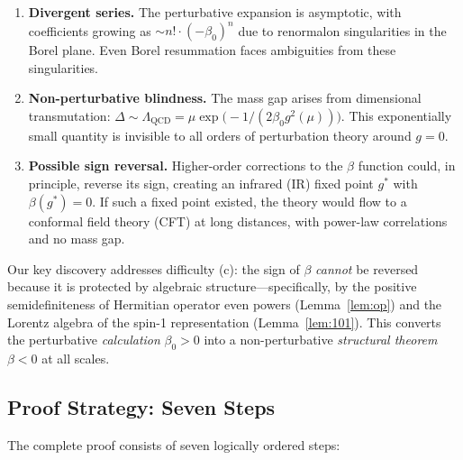 \documentclass[12pt,a4paper]{article}
\theoremstyle{plain}
\theoremstyle{definition}
\theoremstyle{remark}
\begin{document}
\begin{enumerate}[label=(\alph*),leftmargin=2.5em]
\item \textbf{Divergent series.} The perturbative expansion is asymptotic, with coefficients growing as $\sim n!\cdot(-\beta_0)^n$ due to renormalon singularities in the Borel plane. Even Borel resummation faces ambiguities from these singularities.

\item \textbf{Non-perturbative blindness.} The mass gap arises from dimensional transmutation: $\Delta\sim\Lambda_{\mathrm{QCD}}=\mu\exp\!\bigl(-1/(2\beta_0 g^2(\mu))\bigr)$. This exponentially small quantity is invisible to all orders of perturbation theory around $g=0$.

\item \textbf{Possible sign reversal.} Higher-order corrections to the $\beta$ function could, in principle, reverse its sign, creating an infrared (IR) fixed point $g^*$ with $\beta(g^*)=0$. If such a fixed point existed, the theory would flow to a conformal field theory (CFT) at long distances, with power-law correlations and no mass gap.
\end{enumerate}

Our key discovery addresses difficulty (c): the sign of $\beta$ \emph{cannot} be reversed because it is protected by algebraic structure---specifically, by the positive semidefiniteness of Hermitian operator even powers (Lemma~\ref{lem:op}) and the Lorentz algebra of the spin-1 representation (Lemma~\ref{lem:101}). This converts the perturbative \emph{calculation} $\beta_0>0$ into a non-perturbative \emph{structural theorem} $\beta<0$ at all scales.

\subsection{Proof Strategy: Seven Steps}\label{sec:strategy}

The complete proof consists of seven logically ordered steps:
\end{document}
